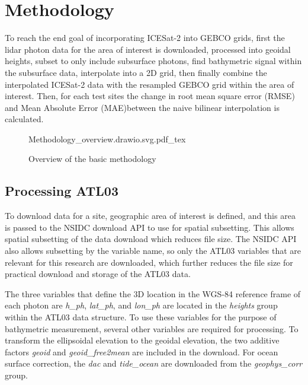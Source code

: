 \section{Methodology}

To reach the end goal of incorporating ICESat-2 into GEBCO grids, first the lidar photon data for the area of interest is downloaded, processed into geoidal heights, subset to only include subsurface photons, find bathymetric signal within the subsurface data, interpolate into a 2D grid, then finally combine the interpolated ICESat-2 data with the resampled GEBCO grid within the area of interest. Then, for each test sites the change in root mean square error (RMSE) and Mean Absolute Error (MAE)between the naive bilinear interpolation is calculated. 

\begin{figure}[h]
    \centering
    {Methodology_overview.drawio.svg.pdf_tex}
    \caption{Overview of the basic methodology}
    \label{fig:methodology-overview}
\end{figure}

\subsection{Processing ATL03}
To download data for a site, geographic area of interest is defined, and this area is passed to the NSIDC download API to use for spatial subsetting. This allows spatial subsetting of the data download which reduces file size. The NSIDC API also allows subsetting by the variable name, so only the ATL03 variables that are relevant for this research are downloaded, which further reduces the file size for practical download and storage of the ATL03 data. 

The three variables that define the 3D location in the WGS-84 reference frame of each photon are \emph{h\_ph}, \emph{lat\_ph}, and \emph{lon\_ph} are located in the \emph{heights} group within the ATL03 data structure. To use these variables for the purpose of bathymetric measurement, several other variables are required for processing. To transform the ellipsoidal elevation to the geoidal elevation, the two additive factors \emph{geoid} and \emph{geoid\_free2mean} are included in the download. For ocean surface correction, the \emph{dac} and \emph{tide\_ocean} are downloaded from the \emph{geophys\_corr} group.

